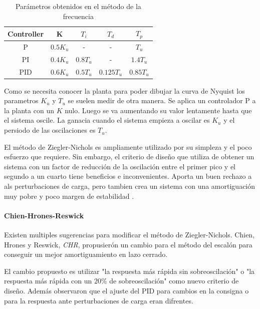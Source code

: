 \documentclass{book}
\begin{document}
\begin{table}[h!]
\centering
\caption{Par\'ametros obtenidos en el m\'etodo de la frecuencia \cite{PIDbook}}
\label{ta:ZNfreq}
\begin{tabular}{c|cccc}
Controller & K        & $T_{i}$  & $T_{d}$    & $T_{p}$   \\ \hline
P          & $0.5K_u$ & -        & -          & $T_u$     \\
PI         & $0.4K_u$ & $0.8T_u$ & -          & $1.4T_u$  \\
PID        & $0.6K_u$ & $0.5T_u$ & $0.125T_u$ & $0.85T_u$
\end{tabular}
\end{table}

Como se necesita conocer la planta para poder dibujar la curva de Nyquist los parametros $K_u$ y $T_u$ se suelen medir de otra manera. Se aplica un controlador P a la planta con un $K$ nulo. Luego se va aumentando su valor lentamente hasta que el sistema oscile. La ganacia cuando el sistema empieza a oscilar es $K_u$ y el persiodo de las oscilaciones es $T_u$. \par

El m\'etodo de Ziegler-Nichols es ampliamente utilizado por su simpleza y el poco esfuerzo que requiere. Sin embargo, el criterio de diseño que utiliza de obtener un sistema con un factor de reducci\'on de la oscilaci\'on entre el primer pico y el segundo a un cuarto tiene beneficios e inconvenientes. Aporta un buen rechazo a als perturbaciones de carga, pero tambien crea un sistema con una amortiguaci\'on muy pobre y poco margen de estabilidad \cite{PIDbook}. \par

		\paragraph{Chien-Hrones-Reswick}

Existen multiples sugerencias para modificar el m\'etodo de Ziegler-Nichols. Chien, Hrones y Reswick, \emph{CHR}, propusier\'on un cambio para el m\'etodo del escal\'on para conseguir un mejor amortiguamiento en lazo cerrado. \par

El cambio propuesto es utilizar "la respuesta m\'as r\'apida sin sobreoscilaci\'on" o "la respuesta m\'as r\'apida con un 20\% de sobreoscilaci\'on" como nuevo criterio de diseño. Adem\'as observaron que el ajuste del PID para cambios en la consigna o para la respuesta ante perturbaciones de carga eran difrentes. \par
\end{document}
